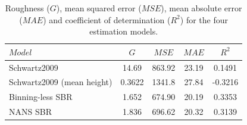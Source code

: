 \documentclass[10pt,final]{siamltex}
\begin{document}
\begin{table}
  \centering
  \begin{tabular}{|l|c|c|c|c|}
    \hline
    $Model$                    &$G$    &$MSE$  &$MAE$  &$R^2$    \\
    \hline
    Schwartz2009               &14.69  &863.92 &23.19  & 0.1491  \\
    Schwartz2009 (mean height) &0.3622 &1341.8 &27.84  &-0.3216  \\
    Binning-less SBR           &1.652  &674.90 &20.19  & 0.3353  \\
    NANS SBR                   &1.836  &696.62 &20.32  & 0.3139  \\
    \hline
  \end{tabular}
  \caption{Roughness ($G$), mean squared error ($MSE$), mean absolute error ($MAE$) and coefficient of determination ($R^2$) for the four estimation models.}
  \label{regstats}
\end{table}
%
\end{document}

